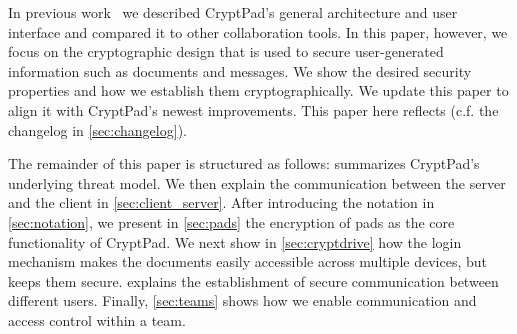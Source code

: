 In previous work~\cite{MacSween2018, MacSween2019} we described CryptPad's general architecture and user interface and compared it to other collaboration tools.
In this paper, however, we focus on the cryptographic design that is used to secure user-generated information such as documents and messages.
We show the desired security properties and how we establish them cryptographically.
We update this paper to align it with CryptPad's newest improvements.
This paper here reflects \myCryptPadVersion (c.f. the changelog in \cref{sec:changelog}).

The remainder of this paper is structured as follows:
 summarizes CryptPad's underlying threat model.
We then explain the communication between the server and the client in \cref{sec:client_server}.
After introducing the notation in \cref{sec:notation}, we present in \cref{sec:pads} the encryption of pads as the core functionality of CryptPad.
We next show in \cref{sec:cryptdrive} how the login mechanism makes the documents easily accessible across multiple devices, but keeps them secure.
 explains the establishment of secure communication between different users.
Finally, \cref{sec:teams} shows how we enable communication and access control within a team.
